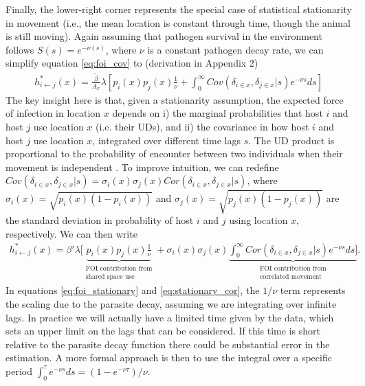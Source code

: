 \documentclass[letterpaper]{article}
\begin{document}
Finally, the lower-right corner represents the special case of statistical stationarity in movement (i.e., the mean location is constant through time, though the animal is still moving).
Again assuming that pathogen survival in the environment follows $S(s) = e^{-\nu (s)}$, where $\nu$ is a constant pathogen decay rate,  we can simplify equation \ref{eq:foi_cov} to (derivation in Appendix 2)
\begin{equation}
    \begin{aligned}
   h^*_{i \leftarrow j}(x) = \frac{\tilde{\beta}}{A_x} \lambda \left[p_i(x)p_j(x) \frac{1}{\nu} + \int_{0}^{\infty} Cov(\delta_{i \in x}, \delta_{j \in x} | s) e^{-\nu s} ds\right]
    \end{aligned}
    \label{eq:foi_stationary}
\end{equation}
The key insight here is that, given a stationarity assumption, the expected force of infection in location $x$ depends on i) the marginal probabilities that host $i$ and host $j$ use location $x$ (i.e. their UDs),  and ii) the covariance in how host $i$ and host $j$ use location $x$, integrated over different time lags $s$. The UD product is proportional to the probability of encounter between two individuals when their movement is independent \citep{Noonan2021}.  
To improve intuition, we can redefine $Cov(\delta_{i \in x}, \delta_{j \in x} | s) = \sigma_i(x) \sigma_j(x) Cor(\delta_{i \in x}, \delta_{j \in x} | s)$, where $\sigma_i(x) = \sqrt{p_i(x)(1 - p_i(x))}$  and $\sigma_j(x) = \sqrt{p_j(x)(1 - p_j(x))}$ are the standard deviation in probability of host $i$ and $j$ using location $x$, respectively.  We can then write
\begin{equation}
    \begin{aligned}
    h^*_{i \leftarrow j}(x) = \beta' \lambda [ \underbrace{p_i(x)p_j(x) \frac{1}{\nu}}_{\substack{\text{FOI contribution from} \\ \text{shared space use}}} + \sigma_i(x) \sigma_j(x) \underbrace{\int_{0}^{\infty} Cor(\delta_{i \in x}, \delta_{j \in x} | s) e^{-\nu s} ds]}_{\substack{\text{FOI contribution from} \\ \text{correlated movement}}}.
    \end{aligned}
    \label{eq:stationary_cor}
\end{equation}
In equations \ref{eq:foi_stationary} and \ref{eq:stationary_cor}, the $1/\nu$ term represents the scaling due to the parasite decay, assuming we are integrating over infinite lags. In practice we will actually have a limited time given by the data, which sets an upper limit on the lags that can be considered. If this time is short relative to the parasite decay function there could be substantial error in the estimation. A more formal approach is then to use the integral over a specific period  $\int_0^{\tau} e^{-\nu s}ds=(1-e^{-\nu\tau})/\nu$.
\end{document}
